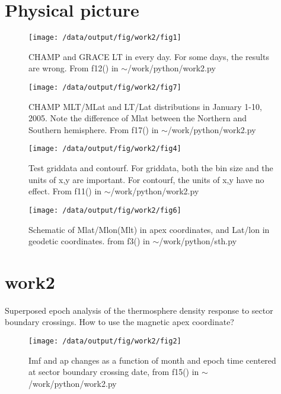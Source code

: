 \documentclass[12pt,a4paper]{article}
\begin{document}
\section{Physical picture}
\begin{figure}[!ht]
    \centering
    \texttt{[image: /data/output/fig/work2/fig1]}
    \label{fig1}
    \caption{CHAMP and GRACE LT in every day. For some days, the results are wrong. From f12() in $\sim$/work/python/work2.py}
\end{figure}

\begin{figure}[!ht]
    \centering
    \texttt{[image: /data/output/fig/work2/fig7]}
    \label{fig2}
    \caption{ CHAMP MLT/MLat and LT/Lat distributions in January 1-10, 2005. Note the difference of Mlat between the Northern and Southern hemisphere. From f17() in $\sim$/work/python/work2.py}
\end{figure}

\begin{figure}[!ht]
    \centering
    \texttt{[image: /data/output/fig/work2/fig4]}
    \label{fig3}
    \caption{Test griddata and contourf. For griddata, both the bin size and the units of x,y are important. For contourf, the units of x,y have no effect. From f11() in $\sim$/work/python/work2.py}
\end{figure}

\begin{figure}[!ht]
    \centering
    \texttt{[image: /data/output/fig/work2/fig6]}
    \label{fig4}
    \caption{Schematic of Mlat/Mlon(Mlt) in apex coordinates, and Lat/lon in geodetic coordinates. from f3() in $\sim$/work/python/sth.py}
\end{figure}
\newpage

\section{work2}
Superposed epoch analysis of the thermosphere density response to sector boundary crossings.
How to use the magnetic apex coordinate?
\begin{figure}[!ht]
    \centering
    \texttt{[image: /data/output/fig/work2/fig2]}
    \label{fig5}
    \caption{Imf and ap changes as a function of month and epoch time centered at sector boundary crossing date, from f15() in $\sim$/work/python/work2.py}
\end{figure}
\end{document}
